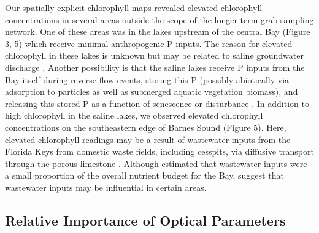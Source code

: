 Our spatially explicit chlorophyll maps revealed elevated chlorophyll concentrations in several areas outside the scope of the longer-term grab sampling network. One of these areas was in the lakes upstream of the central Bay (Figure 3, 5) which receive minimal anthropogenic P inputs. The reason for elevated chlorophyll in these lakes is unknown but may be related to saline groundwater discharge \citep{price2006coastal}. Another possibility is that the saline lakes receive P inputs from the Bay itself during reverse-flow events, storing this P (possibly abiotically via adsorption to particles as well as submerged aquatic vegetation biomass), and releasing this stored P as a function of senescence or disturbance \citep{rudnick1999phosphorus}. In addition to high chlorophyll in the saline lakes, we observed elevated chlorophyll concentrations on the southeastern edge of Barnes Sound (Figure 5). Here, elevated chlorophyll readings may be a result of wastewater inputs from the Florida Keys from domestic waste fields, including cesspits, via diffusive transport through the porous limestone \citep{rudnick1999phosphorus}. Although \citet{rudnick1999phosphorus} estimated that wastewater inputs were a small proportion of the overall nutrient budget for the Bay, \citet{szmant1996water} suggest that wastewater inputs may be influential in certain areas. 

\subsection{Relative Importance of Optical Parameters}
\label{optical}

